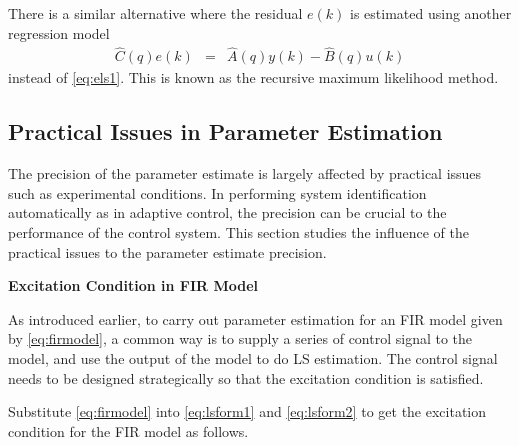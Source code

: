 There is a similar alternative where the residual $e(k)$ is estimated using another regression model
\begin{eqnarray}
\hat{C}(q)e(k) &=& \hat{A}(q)y(k) - \hat{B}(q)u(k) \nonumber
\end{eqnarray}
instead of \eqref{eq:els1}. This is known as the recursive maximum likelihood method.

\subsection{Practical Issues in Parameter Estimation}

The precision of the parameter estimate is largely affected by practical issues such as experimental conditions. In performing system identification automatically as in adaptive control, the precision can be crucial to the performance of the control system. This section studies the influence of the practical issues to the parameter estimate precision.

\vspace{0.1in}
\noindent \textbf{Excitation Condition in FIR Model}
\vspace{0.1in}

As introduced earlier, to carry out parameter estimation for an FIR model given by \eqref{eq:firmodel}, a common way is to supply a series of control signal to the model, and use the output of the model to do LS estimation. The control signal needs to be designed strategically so that the excitation condition is satisfied.

Substitute \eqref{eq:firmodel} into \eqref{eq:lsform1} and \eqref{eq:lsform2} to get the excitation condition for the FIR model as follows.









